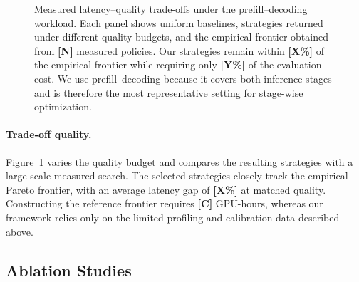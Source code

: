 \documentclass[letterpaper]{article} %
\begin{document}
\begin{figure}[t]
\centering
\begin{minipage}[t]{0.48\linewidth}
\centering
{}
\end{minipage}
\hfill
\begin{minipage}[t]{0.48\linewidth}
\centering
{}
\end{minipage}
\caption{Measured latency--quality trade-offs under the prefill--decoding workload. Each panel shows uniform baselines, strategies returned under different quality budgets, and the empirical frontier obtained from \textbf{[N]} measured policies. Our strategies remain within \textbf{[X\%]} of the empirical frontier while requiring only \textbf{[Y\%]} of the evaluation cost. We use prefill--decoding because it covers both inference stages and is therefore the most representative setting for stage-wise optimization.}
\label{fig:pareto_tradeoff}
\end{figure}

\paragraph{Trade-off quality.}
Figure~\ref{fig:pareto_tradeoff} varies the quality budget and compares the resulting strategies with a large-scale measured search. The selected strategies closely track the empirical Pareto frontier, with an average latency gap of \textbf{[X\%]} at matched quality. Constructing the reference frontier requires \textbf{[C]} GPU-hours, whereas our framework relies only on the limited profiling and calibration data described above.

\subsection{Ablation Studies}
\end{document}
